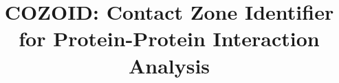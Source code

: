 \documentclass[twocolumn]{bmcart}%
\begin{document}
\begin{frontmatter}

\begin{fmbox}


\title{COZOID: Contact Zone Identifier for Protein-Protein Interaction Analysis}

\author[
   addressref={aff1},
   email={furmanova@mail.muni.cz}
]{ }
\author[
   addressref={aff2},     %
   email={jan.byska@gmail.com}   %
]{ }
\author[
   addressref={aff3},             %
   email={groeller@cg.tuwien.ac.at}   %
]{ }
\author[
   addressref={aff3},             %
   email={viola@cg.tuwien.ac.at}   %
]{ }
\author[
   addressref={aff1},             %
   email={jpalecek@sci.muni.cz}   %
]{ }
\author[
   addressref={aff1},             %
   email={kozlikova@fi.muni.cz}   %
]{ }



\end{fmbox}
\end{frontmatter}
\end{document}
